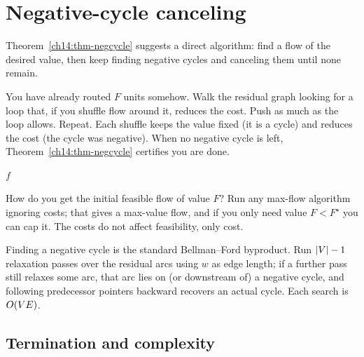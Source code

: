 \section{Negative-cycle canceling}
\label{ch14:cancel}

Theorem~\ref{ch14:thm-negcycle} suggests a direct algorithm: find a flow of the desired value, then keep finding negative cycles and canceling them until none remain.

\begin{intuitionbox}
You have already routed $F$ units somehow. Walk the residual graph looking for a loop that, if you shuffle flow around it, reduces the cost. Push as much as the loop allows. Repeat. Each shuffle keeps the value fixed (it is a cycle) and reduces the cost (the cycle was negative). When no negative cycle is left, Theorem~\ref{ch14:thm-negcycle} certifies you are done.
\end{intuitionbox}

\begin{algorithm}[H]
\caption{Negative-Cycle Canceling}
\label{ch14:alg-cancel}
\Return $f$\;
\end{algorithm}

How do you get the initial feasible flow of value $F$? Run any max-flow algorithm ignoring costs; that gives a max-value flow, and if you only need value $F<F^\star$ you can cap it. The costs do not affect feasibility, only cost.

\begin{whybox}
Finding a negative cycle is the standard Bellman--Ford byproduct. Run $\lvert V\rvert-1$ relaxation passes over the residual arcs using $w$ as edge length; if a further pass still relaxes some arc, that arc lies on (or downstream of) a negative cycle, and following predecessor pointers backward recovers an actual cycle. Each search is $O(VE)$.
\end{whybox}

\subsection{Termination and complexity}

